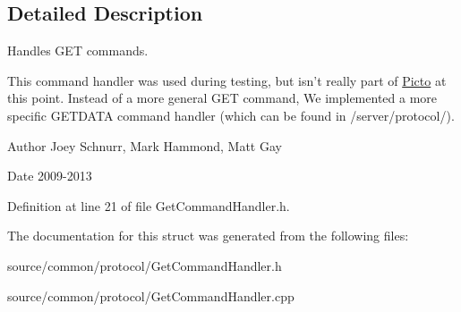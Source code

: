 \subsection{Detailed Description}
Handles G\-E\-T commands. 

This command handler was used during testing, but isn't really part of \hyperlink{namespace_picto}{Picto} at this point. Instead of a more general G\-E\-T command, We implemented a more specific G\-E\-T\-D\-A\-T\-A command handler (which can be found in /server/protocol/). \begin{DoxyAuthor}{Author}
Joey Schnurr, Mark Hammond, Matt Gay 
\end{DoxyAuthor}
\begin{DoxyDate}{Date}
2009-\/2013 
\end{DoxyDate}


Definition at line 21 of file Get\-Command\-Handler.\-h.



The documentation for this struct was generated from the following files\-:\begin{DoxyCompactItemize}
\item 
source/common/protocol/Get\-Command\-Handler.\-h\item 
source/common/protocol/Get\-Command\-Handler.\-cpp\end{DoxyCompactItemize}
